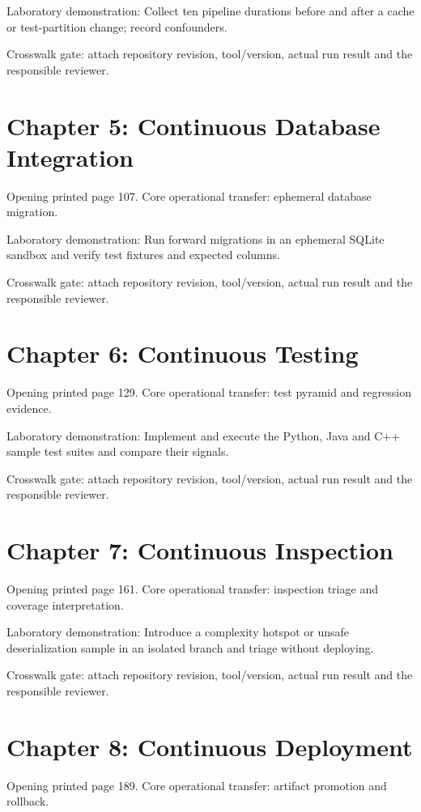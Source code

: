 \documentclass[11pt,letterpaper]{article}
\begin{document}
Laboratory demonstration: Collect ten pipeline durations before and after a cache or test-partition change; record confounders.

Crosswalk gate: attach repository revision, tool/version, actual run result and the responsible reviewer.

\section{Chapter 5: Continuous Database Integration}
Opening printed page 107. Core operational transfer: ephemeral database migration.

Laboratory demonstration: Run forward migrations in an ephemeral SQLite sandbox and verify test fixtures and expected columns.

Crosswalk gate: attach repository revision, tool/version, actual run result and the responsible reviewer.

\section{Chapter 6: Continuous Testing}
Opening printed page 129. Core operational transfer: test pyramid and regression evidence.

Laboratory demonstration: Implement and execute the Python, Java and C++ sample test suites and compare their signals.

Crosswalk gate: attach repository revision, tool/version, actual run result and the responsible reviewer.

\section{Chapter 7: Continuous Inspection}
Opening printed page 161. Core operational transfer: inspection triage and coverage interpretation.

Laboratory demonstration: Introduce a complexity hotspot or unsafe deserialization sample in an isolated branch and triage without deploying.

Crosswalk gate: attach repository revision, tool/version, actual run result and the responsible reviewer.

\section{Chapter 8: Continuous Deployment}
Opening printed page 189. Core operational transfer: artifact promotion and rollback.
\end{document}
